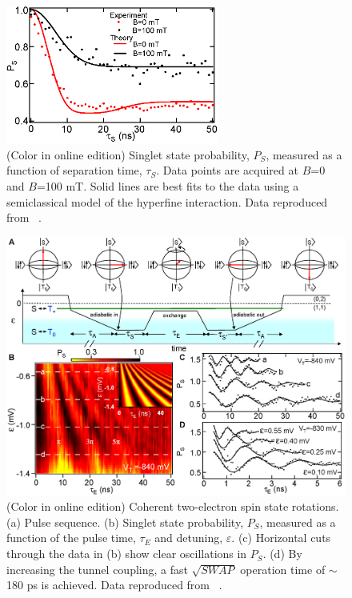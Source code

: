 \documentclass[12pt,aps,nofootinbib]{revtex4-1}
\begin{document}
\begin{figure}[htb]
\includegraphics[width=7cm]{hanson_fig47.eps}
\caption{(Color in online edition) Singlet state probability, $P_{S}$, measured as a
function of separation time, $\tau_{S}$. Data points are acquired
at $B$=0 and $B$=100 mT. Solid lines are best fits to the data
using a semiclassical model of the hyperfine interaction. Data
reproduced from ~\textcite{petta05}.}
\label{Fig:SingletDecay}
\end{figure}

\begin{figure}[htb]
\includegraphics[width=14cm]{hanson_fig48.eps}
\caption{(Color in online edition) Coherent two-electron spin state rotations. (a) Pulse
sequence. (b) Singlet state probability, $P_{S}$, measured as a
function of the pulse time, $\tau_{E}$ and detuning,
$\varepsilon$. (c) Horizontal cuts through the data in (b) show clear
oscillations in $P_{S}$. (d) By increasing the tunnel coupling, a
fast $\sqrt{SWAP}$ operation time of $\sim$180 ps is achieved. Data
reproduced from ~\textcite{petta05}.}
\label{Fig:SWAP}
\end{figure}
\end{document}

